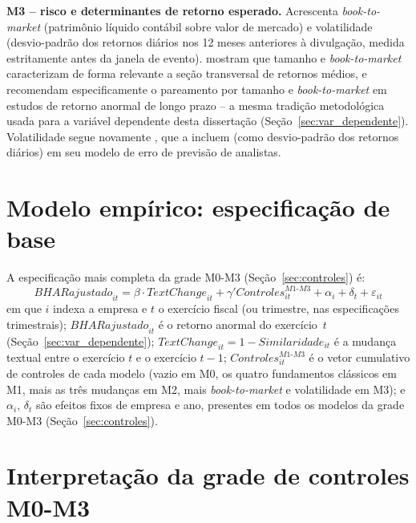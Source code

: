 \documentclass[a4paper,12pt]{report}
\begin{document}
\textbf{M3 -- risco e determinantes de retorno esperado.} Acrescenta \textit{book-to-market} (patrimônio líquido contábil sobre valor de mercado) e volatilidade (desvio-padrão dos retornos diários nos 12 meses anteriores à divulgação, medida estritamente antes da janela de evento).  mostram que tamanho e \textit{book-to-market} caracterizam de forma relevante a seção transversal de retornos médios, e  recomendam especificamente o pareamento por tamanho e \textit{book-to-market} em estudos de retorno anormal de longo prazo -- a mesma tradição metodológica usada para a variável dependente desta dissertação (Seção~\ref{sec:var_dependente}). Volatilidade segue novamente , que a incluem (como desvio-padrão dos retornos diários) em seu modelo de erro de previsão de analistas.

\section{Modelo empírico: especificação de base}
\label{sec:modelo}

A especificação mais completa da grade M0-M3 (Seção~\ref{sec:controles}) é:
\begin{equation}
    \mathit{BHARajustado}_{it} = \beta \cdot \mathit{TextChange}_{it} + \gamma' \mathit{Controles}^{M1\text{-}M3}_{it} + \alpha_i + \delta_t + \varepsilon_{it}
    \label{eq:base}
\end{equation}
em que $i$ indexa a empresa e $t$ o exercício fiscal (ou trimestre, nas especificações trimestrais); $\mathit{BHARajustado}_{it}$ é o retorno anormal do exercício~$t$ (Seção~\ref{sec:var_dependente}); $\mathit{TextChange}_{it} = 1 - \mathit{Similaridade}_{it}$ é a mudança textual entre o exercício $t$ e o exercício $t-1$; $\mathit{Controles}^{M1\text{-}M3}_{it}$ é o vetor cumulativo de controles de cada modelo (vazio em M0, os quatro fundamentos clássicos em M1, mais as três mudanças em M2, mais \textit{book-to-market} e volatilidade em M3); e $\alpha_i$, $\delta_t$ são efeitos fixos de empresa e ano, presentes em todos os modelos da grade M0-M3 (Seção~\ref{sec:controles}).

\section{Interpretação da grade de controles M0-M3}
\label{sec:leitura_beta}
\end{document}
